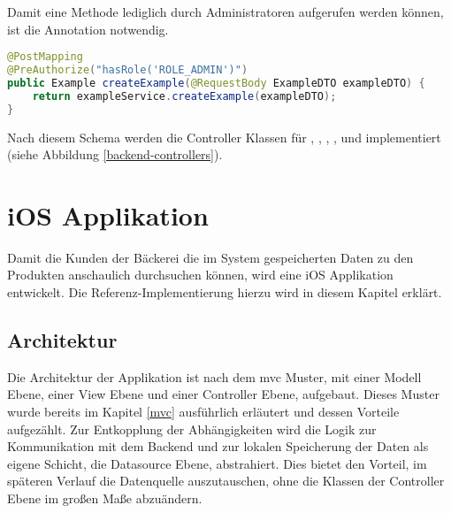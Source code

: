 Damit eine Methode lediglich durch Administratoren aufgerufen werden können, ist die Annotation  notwendig.
\begin{lstlisting}[language=Java]
@PostMapping
@PreAuthorize("hasRole('ROLE_ADMIN')")
public Example createExample(@RequestBody ExampleDTO exampleDTO) {
	return exampleService.createExample(exampleDTO);
}
\end{lstlisting}

Nach diesem Schema werden die Controller Klassen für , , , ,  und  implementiert (siehe Abbildung \ref{backend-controllers}). 

\clearpage


\clearpage

\section{iOS Applikation}
Damit die Kunden der Bäckerei die im System gespeicherten Daten zu den Produkten anschaulich durchsuchen können, wird eine iOS Applikation entwickelt.
Die Referenz-Implementierung hierzu wird in diesem Kapitel erklärt.

\subsection{Architektur}
Die Architektur der Applikation ist nach dem \gls{mvc} Muster, mit einer Modell Ebene, einer View Ebene und einer Controller Ebene, aufgebaut. Dieses Muster wurde bereits im Kapitel \ref{mvc} ausführlich erläutert und dessen Vorteile aufgezählt.
Zur Entkopplung der Abhängigkeiten wird die Logik zur Kommunikation mit dem Backend und zur lokalen Speicherung der Daten als eigene Schicht, die Datasource Ebene, abstrahiert.
Dies bietet den Vorteil, im späteren Verlauf die Datenquelle auszutauschen, ohne die Klassen der Controller Ebene im großen Maße abzuändern.

